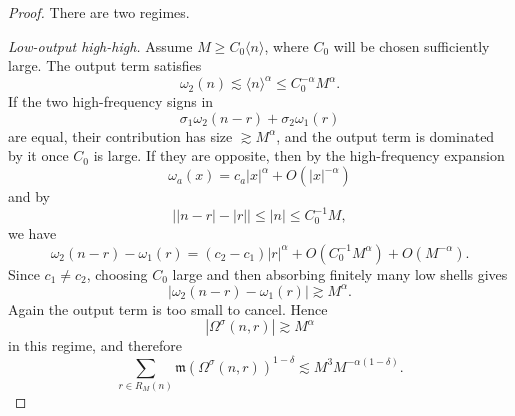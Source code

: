\documentclass[10pt]{amsart}
\numberwithin{equation}{section}
\theoremstyle{plain}
\theoremstyle{definition}
\theoremstyle{remark}
\newcommand{\la}{\langle}
\newcommand{\ra}{\rangle}
\newcommand{\frakm}{\mathfrak{m}}
\begin{document}
\begin{proof}
There are two regimes.

\emph{Low-output high-high.}  Assume \(M\ge C_0\la n\ra\), where \(C_0\) will be chosen sufficiently large.  The output term satisfies
\[
        \omega_2(n)\lesssim \la n\ra^\alpha\le C_0^{-\alpha}M^\alpha.
\]
If the two high-frequency signs in
\[
        \sigma_1\omega_2(n-r)+\sigma_2\omega_1(r)
\]
are equal, their contribution has size \(\gtrsim M^\alpha\), and the output term is dominated by it once \(C_0\) is large.  If they are opposite, then by the high-frequency expansion
\[
        \omega_a(x)=c_a|x|^\alpha+O(|x|^{-\alpha})
\]
and by
\[
        \bigl||n-r|-|r|\bigr|\le |n|\le C_0^{-1}M,
\]
we have
\[
        \omega_2(n-r)-\omega_1(r)
        =(c_2-c_1)|r|^\alpha+O(C_0^{-1}M^\alpha)+O(M^{-\alpha}).
\]
Since \(c_1\ne c_2\), choosing \(C_0\) large and then absorbing finitely many low shells gives
\[
        |\omega_2(n-r)-\omega_1(r)|\gtrsim M^\alpha.
\]
Again the output term is too small to cancel.  Hence
\[
        |\Omega^\sigma(n,r)|\gtrsim M^\alpha
\]
in this regime, and therefore
\[
        \sum_{r\in R_M(n)}\frakm(\Omega^\sigma(n,r))^{1-\delta}
        \lesssim M^3M^{-\alpha(1-\delta)}.
\]


\end{proof}
\end{document}
